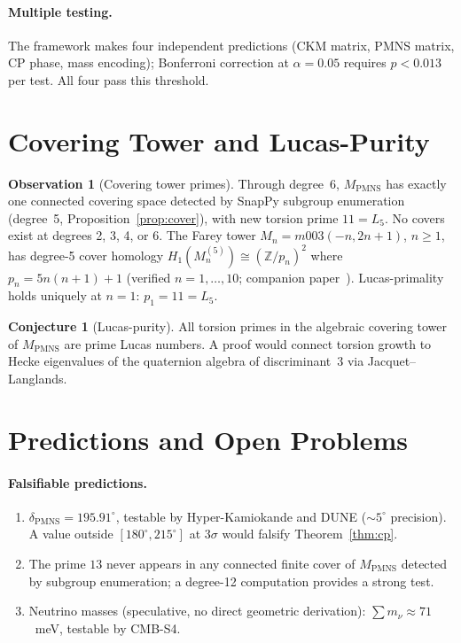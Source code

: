 \documentclass[11pt,a4paper]{article}
\theoremstyle{definition}
\newtheorem{observation}[theorem]{Observation}
\newtheorem{conjecture}[theorem]{Conjecture}
\theoremstyle{remark}
\newcommand{\ZZ}{\mathbb{Z}}
\newcommand{\MPMNS}{M_{\mathrm{PMNS}}}
\begin{document}
\paragraph{Multiple testing.}
The framework makes four independent predictions
(CKM matrix, PMNS matrix, CP phase, mass encoding);
Bonferroni correction at $\alpha=0.05$ requires $p<0.013$
per test. All four pass this threshold.

\section{Covering Tower and Lucas-Purity}
\label{sec:covering}

\begin{observation}[Covering tower primes]
\label{obs:tower}
Through degree~6, $\MPMNS$ has exactly one connected covering
space detected by SnapPy subgroup enumeration (degree~5,
Proposition~\ref{prop:cover}), with new torsion prime $11=L_5$.
No covers exist at degrees 2, 3, 4, or 6.
The Farey tower $M_n = m003(-n,2n+1)$, $n\geq1$, has
degree-5 cover homology $H_1(M_n^{(5)})\cong(\ZZ/p_n)^2$
where $p_n = 5n(n+1)+1$ (verified $n=1,\ldots,10$;
companion paper~\cite{Gentry:Farey}).
Lucas-primality holds uniquely at $n=1$: $p_1 = 11 = L_5$.
\end{observation}

\begin{conjecture}[Lucas-purity]
\label{conj:lucas}
All torsion primes in the algebraic covering tower of $\MPMNS$
are prime Lucas numbers.
A proof would connect torsion growth to Hecke eigenvalues of
the quaternion algebra of discriminant~3 via Jacquet--Langlands.
\end{conjecture}

\section{Predictions and Open Problems}
\label{sec:predictions}

\paragraph{Falsifiable predictions.}
\begin{enumerate}[(1)]
\item $\delta_{\mathrm{PMNS}} = 195.91^\circ$,
  testable by Hyper-Kamiokande and DUNE ($\sim5^\circ$ precision).
  A value outside $[180^\circ,215^\circ]$ at $3\sigma$
  would falsify Theorem~\ref{thm:cp}.
\item The prime $13$ never appears in any connected finite
  cover of $\MPMNS$ detected by subgroup enumeration;
  a degree-12 computation provides a strong test.
\item Neutrino masses (speculative, no direct geometric derivation):
  $\sum m_\nu\approx71$~meV, testable by CMB-S4.
\end{enumerate}
\end{document}
